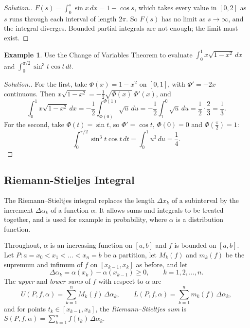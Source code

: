 \documentclass[11pt,a4paper]{article}
\numberwithin{equation}{section}
\theoremstyle{definition}
\newtheorem{exa}[thm]{Example}
\newenvironment{solution}
  {\renewcommand{\qedsymbol}{}\begin{proof}[\textit{Solution}.]}
  {\end{proof}}
\begin{document}
\begin{solution}
$F(s) = \int_0^s\sin x\,dx = 1 - \cos s$, which takes every value in $[0,2]$ as $s$ runs through each interval of length $2\pi$. So $F(s)$ has no limit as $s\longrightarrow\infty$, and the integral diverges. Bounded partial integrals are not enough; the limit must exist.
\end{solution}

\begin{exa}
Use the Change of Variables Theorem to evaluate $\int_0^1x\sqrt{1-x^2}\,dx$ and $\int_0^{\pi/2}\sin^3t\cos t\,dt$.
\end{exa}

\begin{solution}
For the first, take $\Phi(x) = 1 - x^2$ on $[0,1]$, with $\Phi' = -2x$ continuous. Then $x\sqrt{1-x^2} = -\frac{1}{2}\sqrt{\Phi(x)}\,\Phi'(x)$, and
$$\int_0^1x\sqrt{1-x^2}\,dx = -\frac{1}{2}\int_{\Phi(0)}^{\Phi(1)}\sqrt{u}\,du = -\frac{1}{2}\int_1^0\sqrt{u}\,du = \frac{1}{2}\cdot\frac{2}{3} = \frac{1}{3} .$$
For the second, take $\Phi(t) = \sin t$, so $\Phi' = \cos t$, $\Phi(0) = 0$ and $\Phi\left(\frac{\pi}{2}\right) = 1$:
$$\int_0^{\pi/2}\sin^3t\cos t\,dt = \int_0^1u^3\,du = \frac{1}{4} .$$
\end{solution}


\subsection{Riemann-Stieljes Integral}

The Riemann--Stieltjes integral replaces the length $\Delta x_k$ of a subinterval by the increment $\Delta\alpha_k$ of a function $\alpha$. It allows sums and integrals to be treated together, and is used for example in probability, where $\alpha$ is a distribution function.

Throughout, $\alpha$ is an increasing function on $[a,b]$ and $f$ is bounded on $[a,b]$. Let $P: a = x_0 < x_1 < \dots < x_n = b$ be a partition, let $M_k(f)$ and $m_k(f)$ be the supremum and infimum of $f$ on $[x_{k-1},x_k]$ as before, and let
$$\Delta \alpha_k  = \alpha (x_k) - \alpha (x_{k - 1})\geq 0,\qquad k = 1, 2, \dots, n .$$
The \emph{upper} and \emph{lower sums} of $f$ with respect to $\alpha$ are
$$U(P, f, \alpha) = \sum^n_{k =1} M_k(f)\, \Delta \alpha_k, \qquad L(P, f, \alpha) = \sum^n_{k = 1} m_k(f)\, \Delta \alpha_k,$$
and for points $t_k \in [x_{k-1},x_k]$, the \emph{Riemann--Stieltjes sum} is $S(P, f, \alpha) = \sum^n_{k = 1} f(t_k)\, \Delta \alpha_k$.
\end{document}
